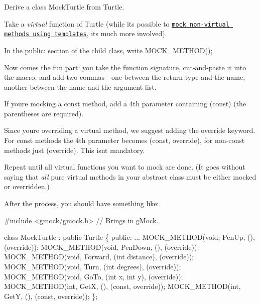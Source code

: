 \begin{DoxyItemize}
\item Derive a class {\ttfamily Mock\+Turtle} from {\ttfamily Turtle}.
\item Take a {\itshape virtual} function of {\ttfamily Turtle} (while it\textquotesingle{}s possible to \href{gmock_cook_book.md#MockingNonVirtualMethods}{\tt mock non-\/virtual methods using templates}, it\textquotesingle{}s much more involved).
\item In the {\ttfamily public\+:} section of the child class, write {\ttfamily M\+O\+C\+K\+\_\+\+M\+E\+T\+H\+O\+D();}
\item Now comes the fun part\+: you take the function signature, cut-\/and-\/paste it into the macro, and add two commas -\/ one between the return type and the name, another between the name and the argument list.
\item If you\textquotesingle{}re mocking a const method, add a 4th parameter containing {\ttfamily (const)} (the parentheses are required).
\item Since you\textquotesingle{}re overriding a virtual method, we suggest adding the {\ttfamily override} keyword. For const methods the 4th parameter becomes {\ttfamily (const, override)}, for non-\/const methods just {\ttfamily (override)}. This isn\textquotesingle{}t mandatory.
\item Repeat until all virtual functions you want to mock are done. (It goes without saying that {\itshape all} pure virtual methods in your abstract class must be either mocked or overridden.)
\end{DoxyItemize}

After the process, you should have something like\+:


\begin{DoxyCode}
\textcolor{preprocessor}{#include <gmock/gmock.h>}  \textcolor{comment}{// Brings in gMock.}

\textcolor{keyword}{class }MockTurtle : \textcolor{keyword}{public} Turtle \{
 \textcolor{keyword}{public}:
  ...
  MOCK\_METHOD(\textcolor{keywordtype}{void}, PenUp, (), (\textcolor{keyword}{override}));
  MOCK\_METHOD(\textcolor{keywordtype}{void}, PenDown, (), (\textcolor{keyword}{override}));
  MOCK\_METHOD(\textcolor{keywordtype}{void}, Forward, (\textcolor{keywordtype}{int} distance), (\textcolor{keyword}{override}));
  MOCK\_METHOD(\textcolor{keywordtype}{void}, Turn, (\textcolor{keywordtype}{int} degrees), (\textcolor{keyword}{override}));
  MOCK\_METHOD(\textcolor{keywordtype}{void}, GoTo, (\textcolor{keywordtype}{int} x, \textcolor{keywordtype}{int} y), (\textcolor{keyword}{override}));
  MOCK\_METHOD(\textcolor{keywordtype}{int}, GetX, (), (\textcolor{keyword}{const}, \textcolor{keyword}{override}));
  MOCK\_METHOD(\textcolor{keywordtype}{int}, GetY, (), (\textcolor{keyword}{const}, \textcolor{keyword}{override}));
\};
\end{DoxyCode}


